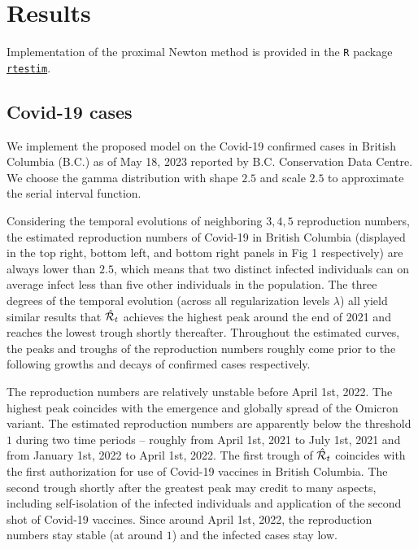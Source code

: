 \section{Results}

Implementation of the proximal Newton method is provided in the \texttt{R} package \href{https://dajmcdon.github.io/rtestim/}{\texttt{rtestim}}. 

\subsection{Covid-19 cases}

We implement the proposed model on the Covid-19 confirmed cases in British Columbia (B.C.) as of May 18, 2023 reported by B.C. Conservation Data Centre. We choose the gamma distribution with shape $2.5$ and scale $2.5$ to approximate the serial interval function.


Considering the temporal evolutions of neighboring $3, 4, 5$ reproduction numbers, the estimated reproduction numbers of Covid-19 in British Columbia (displayed in the top right, bottom left, and bottom right panels in Fig 1 respectively) are always lower than $2.5$, which means that two distinct infected individuals can on average infect less than five other individuals in the population. The three degrees of the temporal evolution (across all regularization levels $\lambda$) all yield similar results that $\hat{\mathcal{R}}_t$ achieves the highest peak around the end of 2021 and reaches the lowest trough shortly thereafter. Throughout the estimated curves, the peaks and troughs of the reproduction numbers roughly come prior to the following growths and decays of confirmed cases respectively.

The reproduction numbers are relatively unstable before April 1st, 2022.
The highest peak coincides with the emergence and globally spread of the Omicron variant. The estimated reproduction numbers are apparently below the threshold $1$ during two time periods -- roughly from April 1st, 2021 to July 1st, 2021 and from January 1st, 2022 to April 1st, 2022. The first trough of $\hat{\mathcal{R}}_t$ coincides with the first authorization for use of Covid-19 vaccines in British Columbia. The second trough shortly after the greatest peak may credit to many aspects, including self-isolation of the infected individuals and application of the second shot of Covid-19 vaccines. 
Since around April 1st, 2022, the reproduction numbers stay stable (at around $1$) and the infected cases stay low. 

